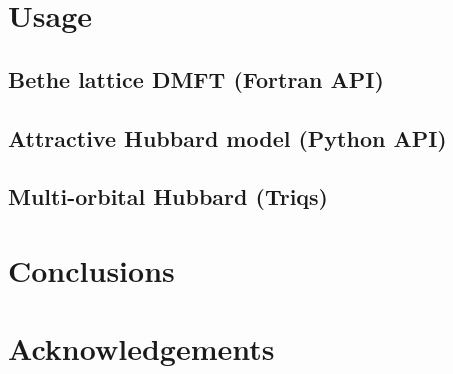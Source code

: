 \documentclass[final,3p,10pt]{elsarticle}
\begin{document}


\section{Usage}\label{SecUsage}
\subsection{Bethe lattice DMFT (Fortran API)}
\subsection{Attractive Hubbard model (Python API)}
\subsection{Multi-orbital Hubbard (Triqs)}














\section{Conclusions}










\section*{Acknowledgements}





\end{document}
